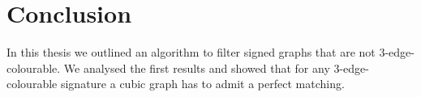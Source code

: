 \chapter*{Conclusion}

\todo{}

In this thesis we outlined an algorithm to filter signed graphs that are not 3-edge-colourable. We analysed the first results and showed that for any 3-edge-colourable signature a cubic graph has to admit a perfect matching.
